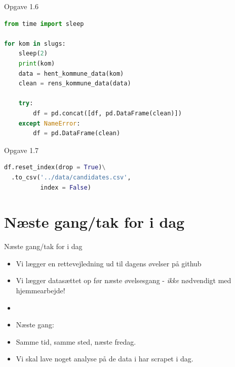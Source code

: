 \documentclass[10pt]{beamer}
\begin{document}
\begin{frame}[fragile]{Opgave 1.6}
\begin{lstlisting}[language=python]
from time import sleep

for kom in slugs:
    sleep(2)
    print(kom)
    data = hent_kommune_data(kom)
    clean = rens_kommune_data(data)

    try:
        df = pd.concat([df, pd.DataFrame(clean)])
    except NameError:
        df = pd.DataFrame(clean)
\end{lstlisting}
\end{frame}
\begin{frame}[fragile]{Opgave 1.7}
  \begin{lstlisting}[language=python]
df.reset_index(drop = True)\
  .to_csv('../data/candidates.csv',
          index = False)
  \end{lstlisting}
\end{frame}

\section{Næste gang/tak for i dag}
\begin{frame}[fragile]{Næste gang/tak for i dag}
\begin{itemize}
\item Vi lægger en rettevejledning ud til dagens øvelser på github
\item Vi lægger datasættet op før næste øvelsesgang - \textit{ikke} nødvendigt med hjemmearbejde!
\pause
\item[]
\item[] Næste gang:
\item Samme tid, samme sted, næste fredag.
\item Vi skal lave noget analyse på de data i har scrapet i dag.
\end{itemize}
\end{frame}
\end{document}
